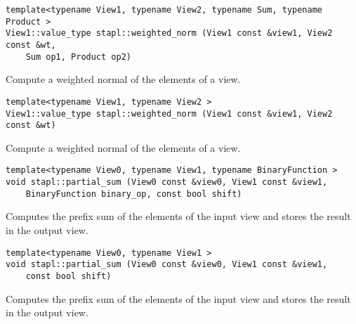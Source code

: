 \begin{verbatim}
template<typename View1, typename View2, typename Sum, typename Product >
View1::value_type stapl::weighted_norm (View1 const &view1, View2 const &wt,
    Sum op1, Product op2)
\end{verbatim}

Compute a weighted normal of the elements of a view.

\begin{verbatim}
template<typename View1, typename View2 >
View1::value_type stapl::weighted_norm (View1 const &view1, View2 const &wt)
\end{verbatim}

Compute a weighted normal of the elements of a view.

\begin{verbatim}
template<typename View0, typename View1, typename BinaryFunction >
void stapl::partial_sum (View0 const &view0, View1 const &view1,
    BinaryFunction binary_op, const bool shift)
\end{verbatim}

Computes the prefix sum of the elements of the input view and stores the result in the output view.

\begin{verbatim}
template<typename View0, typename View1 >
void stapl::partial_sum (View0 const &view0, View1 const &view1,
    const bool shift)
\end{verbatim}

Computes the prefix sum of the elements of the input view and stores the result in the output view.

